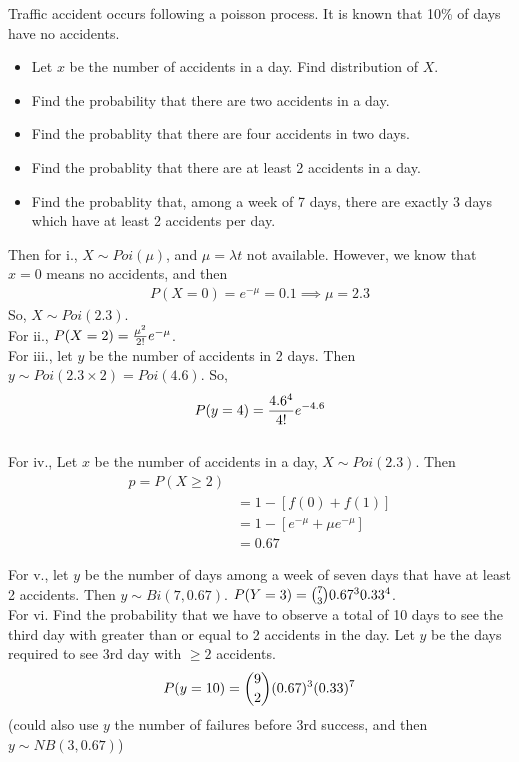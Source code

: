 \documentclass[english, 11pt]{article}
\begin{document}
  \begin{exmp}
    Traffic accident occurs following a poisson process. It is known that 10\% of days have no accidents.
    \begin{itemize}
      \item Let $x$ be the number of accidents in a day. Find distribution of $X$.
      \item Find the probability that there are two accidents in a day.
      \item Find the probablity that there are four accidents in two days.
      \item Find the probablity that there are at least 2 accidents in a day.
      \item Find the probablity that, among a week of 7 days, there are exactly 3 days which have at least 2 accidents per day.
    \end{itemize}
    Then for i., $X \sim Poi(\mu)$, and $\mu = \lambda t$ not available. However, we know that $x = 0$ means no accidents, and then
    \begin{align*}
      P(X = 0) = e^{-\mu} = 0.1 \implies \mu = 2.3
    \end{align*}
    So, $X \sim Poi(2.3)$. \\

    For ii., $P(X = 2) = \frac{\mu^2}{2!}e^{-\mu}$. \\

    For iii., let $y$ be the number of accidents in 2 days. Then $y \sim Poi(2.3 \times 2) = Poi(4.6)$. So,
    \[ P(y = 4) = \frac{4.6^4}{4!}e^{-4.6} \] \\

    For iv., Let $x$ be the number of accidents in a day, $X \sim Poi(2.3)$. Then
    \begin{align*}
      p = P(X \geq 2) \\
      & = 1 - [f(0) + f(1)] \\
      & = 1 - [e^{-\mu} + \mu e^{-\mu}] \\
      & = 0.67
    \end{align*}

    For v., let $y$ be the number of days among a week of seven days that have at least 2 accidents. Then $y \sim Bi(7,0.67)$. $P(Y = 3) = {7 \choose 3}0.67^3 0.33^4$. \\

    For vi. Find the probability that we have to observe a total of 10 days to see the third day with greater than or equal to 2 accidents in the day. Let $y$ be the days required to see 3rd day with $\geq 2$ accidents.
    \[ P(y = 10) = {9 \choose 2} (0.67)^3 (0.33)^7 \]
    (could also use $y$ the number of failures before 3rd success, and then $y \sim NB(3,0.67)$) \\


\end{exmp}
\end{document}
